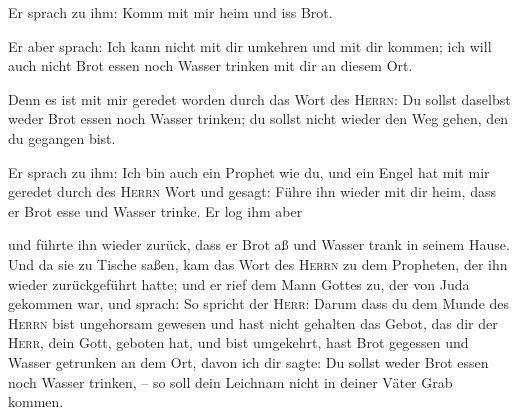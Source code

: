  Er sprach zu ihm: Komm mit mir heim und iss Brot.

 Er aber sprach: Ich kann nicht mit dir umkehren und mit
dir kommen; ich will auch nicht Brot essen noch Wasser trinken mit dir
an diesem Ort.

 Denn es ist mit mir geredet worden durch das Wort des
\textsc{Herrn}: Du sollst daselbst weder Brot essen noch Wasser trinken;
du sollst nicht wieder den Weg gehen, den du gegangen bist.

 Er sprach zu ihm: Ich bin auch ein Prophet wie du, und
ein Engel hat mit mir geredet durch des \textsc{Herrn} Wort und gesagt:
Führe ihn wieder mit dir heim, dass er Brot esse und Wasser trinke. Er
log ihm aber

 und führte ihn wieder zurück, dass er Brot aß und Wasser
trank in seinem Hause.  Und da sie zu Tische saßen, kam
das Wort des \textsc{Herrn} zu dem Propheten, der ihn wieder
zurückgeführt hatte;  und er rief dem Mann Gottes zu, der
von Juda gekommen war, und sprach: So spricht der \textsc{Herr}: Darum
dass du dem Munde des \textsc{Herrn} bist ungehorsam gewesen und hast
nicht gehalten das Gebot, das dir der \textsc{Herr}, dein Gott, geboten
hat,  und bist umgekehrt, hast Brot gegessen und Wasser
getrunken an dem Ort, davon ich dir sagte: Du sollst weder Brot essen
noch Wasser trinken, -- so soll dein Leichnam nicht in deiner Väter Grab
kommen.

